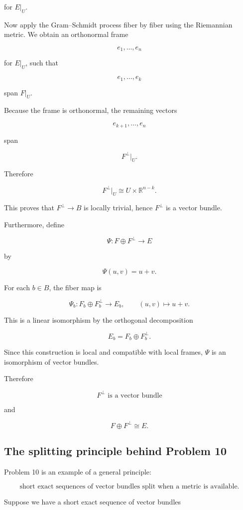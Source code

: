 \documentclass[12pt,a4paper]{article}
\newcommand{\R}{\mathbb{R}}
\theoremstyle{notespace}
\begin{document}
	for \(E|_U\).
	
	Now apply the Gram--Schmidt process fiber by fiber using the Riemannian metric. We obtain an orthonormal frame
	
	\[
	e_1,\dots,e_n
	\]
	
	for \(E|_U\), such that
	
	\[
	e_1,\dots,e_k
	\]
	
	span \(F|_U\).
	
	Because the frame is orthonormal, the remaining vectors
	
	\[
	e_{k+1},\dots,e_n
	\]
	
	span
	
	\[
	F^{\perp}|_U.
	\]
	
	Therefore
	
	\[
	F^{\perp}|_U\cong U\times \R^{n-k}.
	\]
	
	This proves that \(F^{\perp}\to B\) is locally trivial, hence \(F^{\perp}\) is a vector bundle.
	
	Furthermore, define
	
	\[
	\Psi:F\oplus F^{\perp}\to E
	\]
	
	by
	
	\[
	\Psi(u,v)=u+v.
	\]
	
	For each \(b\in B\), the fiber map is
	
	\[
	\Psi_b:F_b\oplus F_b^{\perp}\to E_b,
	\qquad
	(u,v)\mapsto u+v.
	\]
	
	This is a linear isomorphism by the orthogonal decomposition
	
	\[
	E_b=F_b\oplus F_b^{\perp}.
	\]
	
	Since this construction is local and compatible with local frames, \(\Psi\) is an isomorphism of vector bundles.
	
	Therefore
	
	\[
	\boxed{
		F^{\perp}\text{ is a vector bundle}
	}
	\]
	
	and
	
	\[
	\boxed{
		F\oplus F^{\perp}\cong E.
	}
	\]
	
	\subsection{The splitting principle behind Problem 10}
	
	Problem 10 is an example of a general principle:
	
	\[
	\boxed{
		\text{short exact sequences of vector bundles split when a metric is available.}
	}
	\]
	
	Suppose we have a short exact sequence of vector bundles
	
\end{document}
